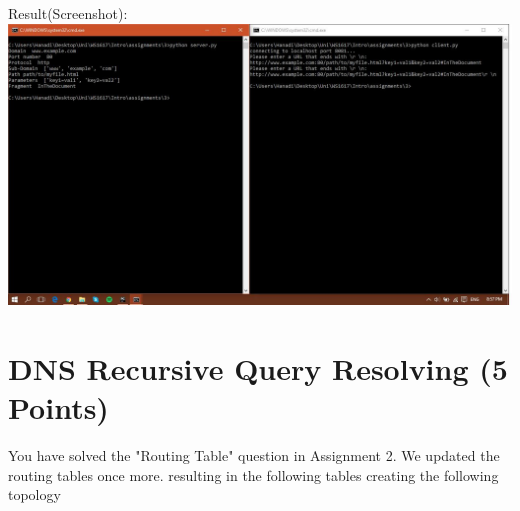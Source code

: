 \documentclass{WeSTassignment}
\begin{document}
Result(Screenshot): \\
\includegraphics[width=1\textwidth]{images/python-result-cmd.png} \\



\section{DNS Recursive Query Resolving (5 Points)}

You have solved the "Routing Table" question in Assignment 2. We updated the routing tables once more. resulting in the following tables creating the following topology 
\end{document}

